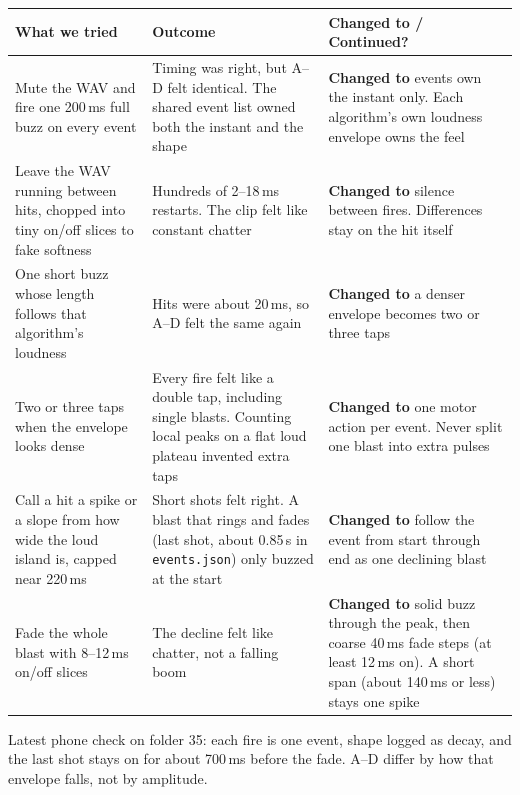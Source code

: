 \documentclass[11pt,a4paper]{article}
\begin{document}
\begin{center}
\small
\begin{tabularx}{\textwidth}{@{}>{\raggedright\arraybackslash}p{4cm}>{\raggedright\arraybackslash}p{4cm}>{\raggedright\arraybackslash}X@{}}
\toprule
\textbf{What we tried} & \textbf{Outcome} & \textbf{Changed to / Continued?} \\
\midrule
Mute the WAV and fire one 200\,ms full buzz on every event & Timing was right, but A--D felt identical. The shared event list owned both the instant and the shape & \textbf{Changed to} events own the instant only. Each algorithm's own loudness envelope owns the feel \\
\addlinespace
Leave the WAV running between hits, chopped into tiny on/off slices to fake softness & Hundreds of 2--18\,ms restarts. The clip felt like constant chatter & \textbf{Changed to} silence between fires. Differences stay on the hit itself \\
\addlinespace
One short buzz whose length follows that algorithm's loudness & Hits were about 20\,ms, so A--D felt the same again & \textbf{Changed to} a denser envelope becomes two or three taps \\
\addlinespace
Two or three taps when the envelope looks dense & Every fire felt like a double tap, including single blasts. Counting local peaks on a flat loud plateau invented extra taps & \textbf{Changed to} one motor action per event. Never split one blast into extra pulses \\
\addlinespace
Call a hit a spike or a slope from how wide the loud island is, capped near 220\,ms & Short shots felt right. A blast that rings and fades (last shot, about 0.85\,s in \texttt{events.json}) only buzzed at the start & \textbf{Changed to} follow the event from start through end as one declining blast \\
\addlinespace
Fade the whole blast with 8--12\,ms on/off slices & The decline felt like chatter, not a falling boom & \textbf{Changed to} solid buzz through the peak, then coarse 40\,ms fade steps (at least 12\,ms on). A short span (about 140\,ms or less) stays one spike \\
\bottomrule
\end{tabularx}
\end{center}

Latest phone check on folder 35: each fire is one event, shape logged as decay, and the last shot stays on for about 700\,ms before the fade. A--D differ by how that envelope falls, not by amplitude.
\end{document}
